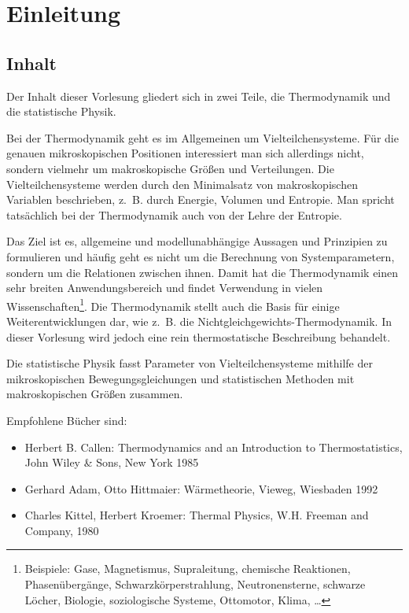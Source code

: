 
\chapter*{Einleitung\label{einleitung}}


\section*{Inhalt}

Der Inhalt dieser Vorlesung gliedert sich in zwei Teile, die Thermodynamik und die statistische Physik. 

Bei der Thermodynamik geht es im Allgemeinen um Vielteilchensysteme. Für die genauen mikroskop\-ischen Positionen interessiert man sich allerdings nicht, sondern vielmehr um makroskopische Größen und Verteilungen.
Die Vielteilchensysteme werden durch den Minimalsatz von makroskopischen Variablen beschrieben, z.~B. durch Energie, Volumen und Entropie.
Man spricht tatsächlich bei der Thermodynamik auch von der Lehre der Entropie.

Das Ziel ist es, allgemeine und modellunabhängige Aussagen und Prinzipien zu formulieren und häufig geht es nicht um die Berechnung von Systemparametern, sondern um die Relationen zwischen ihnen.
Damit hat die Thermodynamik einen sehr breiten Anwendungsbereich und findet Verwendung in vielen 
Wissenschaften\footnote{Beispiele: Gase, Magnetismus, Supraleitung, chemische Reaktionen, Phasenübergänge, Schwarzkörperstrahlung, Neutronensterne, schwarze Löcher, Biologie, soziologische Systeme, Ottomotor, Klima, \dots}.
Die Thermodynamik stellt auch die Basis für einige Weiterentwicklungen dar, wie z.~B. die Nichtgleich\-gewichts-Thermodynamik. In dieser Vorlesung wird jedoch eine rein thermostatische Beschreibung behandelt.

Die statistische Physik fasst Parameter von Vielteilchensysteme mithilfe der mikroskopischen Bewegungsgleichungen und statistischen Methoden mit makroskopischen Größen zusammen.

Empfohlene Bücher sind:

\begin{itemize}
	\item Herbert B. Callen: Thermodynamics and an Introduction to Thermostatistics, John Wiley \& Sons, New York 1985
	\item Gerhard Adam, Otto Hittmaier: Wärmetheorie, Vieweg, Wiesbaden 1992
	\item Charles Kittel, Herbert Kroemer: Thermal Physics, W.H. Freeman and Company, 1980
\end{itemize}

